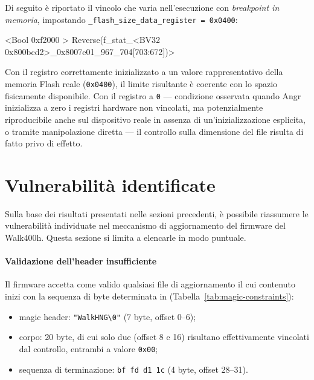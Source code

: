         

        Di seguito è riportato il vincolo che varia nell'esecuzione con \textit{breakpoint in memoria}, impostando \texttt{\_flash\_size\_data\_register = 0x0400}:

\begin{bashcode}
  <Bool 0xf2000 > Reverse(f_stat_<BV32 0x800bcd2>_0x8007e01_967_704[703:672])>
\end{bashcode}
        
        Con il registro correttamente inizializzato a un valore rappresentativo 
        della memoria Flash reale (\texttt{0x0400}), il limite risultante è 
        coerente con lo spazio fisicamente disponibile. Con il registro a 
        \texttt{0} — condizione osservata quando Angr inizializza a zero i 
        registri hardware non vincolati, ma potenzialmente riproducibile anche 
        sul dispositivo reale in assenza di un'inizializzazione esplicita, o 
        tramite manipolazione diretta — il controllo sulla dimensione del file 
        risulta di fatto privo di effetto.

    \section{Vulnerabilità identificate}
    \label{subsec:vulnerabilitá_identificate}
        Sulla base dei risultati presentati nelle sezioni precedenti, è 
        possibile riassumere le vulnerabilità individuate nel meccanismo di 
        aggiornamento del firmware del Walk400h. Questa sezione si limita a 
        elencarle in modo puntuale.
        \paragraph{Validazione dell'header insufficiente}
            Il firmware accetta come valido qualsiasi file di aggiornamento il cui 
            contenuto inizi con la sequenza di byte determinata in  (Tabella~\ref{tab:magic-constraints}):
            
            \begin{itemize}[noitemsep]
                \item magic header: \texttt{"WalkHNG\textbackslash 0"} (7 byte, offset 0--6);
                \item corpo: 20 byte, di cui solo due (offset 8 e 16) risultano 
                effettivamente vincolati dal controllo, entrambi a valore \texttt{0x00};
                \item sequenza di terminazione: \texttt{bf fd d1 1c} (4 byte, offset 28--31).
            \end{itemize}
            
